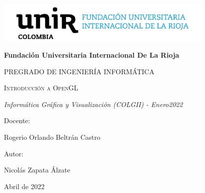 \documentclass[flegn, 10pt]{report}
\begin{document}
  \begin{titlepage}
    \centering
    {\includegraphics[width=0.8\textwidth]{unircol.png}\par}
    \vspace{1cm}
    {\bfseries\LARGE Fundación Universitaria Internacional De La Rioja \par}
    \vspace{1cm}
    {\scshape\Large PREGRADO DE INGENIERÍA INFORMÁTICA \par}
    \vspace{3cm}
    {\scshape\Huge Introducción a OpenGL \par}
    \vspace{3cm}
    {\itshape\Large Informática Gráfica y Visualización (COLGII) - Enero2022 \par}  
    \vfill
    {\Large Docente: \par}
    {\Large Rogerio Orlando Beltr\'an Castro \par}
    \vfill
    {\Large Autor: \par}
    {\Large Nicolás Zapata \'Alzate \par} 
    \vfill
    {\Large Abril de 2022 \par}
  \end{titlepage}

  \tableofcontents
  \newpage
  
  
  
  
\end{document}
